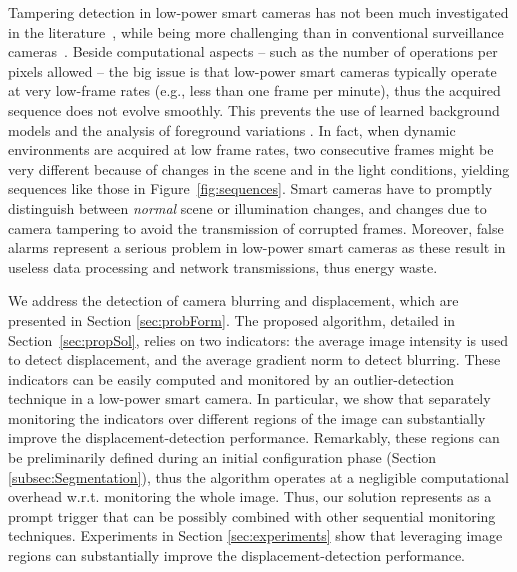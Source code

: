 \documentclass{llncs}
\begin{document}
Tampering detection in low-power smart cameras has not been much investigated in the literature~\cite{alippi2010detecting}, while being more challenging than in conventional surveillance cameras~\cite{perrig2004security}. Beside computational aspects -- such as the number of operations per pixels allowed -- the big issue is that low-power smart cameras typically operate at very low-frame rates (e.g., less than one frame per minute), thus the acquired sequence does not evolve smoothly. This prevents the use of learned background models and the analysis of foreground variations \cite{piccardi2004background}. In fact, when dynamic environments are acquired at low frame rates, two consecutive frames might be very different because of changes in the scene and in the light conditions, yielding sequences like those in Figure~\ref{fig:sequences}. Smart cameras have to promptly distinguish between \emph{normal} scene or illumination changes, and changes due to camera tampering to avoid the transmission of corrupted frames. Moreover, false alarms represent a serious problem in low-power smart cameras as these result in useless data processing and network transmissions, thus energy waste.

We address the detection of camera blurring and displacement, which are presented in Section \ref{sec:probForm}. The proposed algorithm, detailed in Section~\ref{sec:propSol}, relies on two indicators: the average image intensity is used to detect displacement, and the average gradient norm to detect blurring. These indicators can be easily computed and monitored by an outlier-detection technique in a low-power smart camera. In particular, we show that separately monitoring the indicators over different regions of the image can substantially improve the displacement-detection performance. Remarkably, these regions can be preliminarily defined during an initial configuration phase (Section \ref{subsec:Segmentation}), thus the algorithm operates at a negligible computational overhead w.r.t. monitoring the whole image. Thus, our solution represents as a prompt trigger that can be possibly combined with other sequential monitoring techniques. Experiments in Section \ref{sec:experiments} show that leveraging image regions can substantially improve the displacement-detection performance. %
\end{document}

